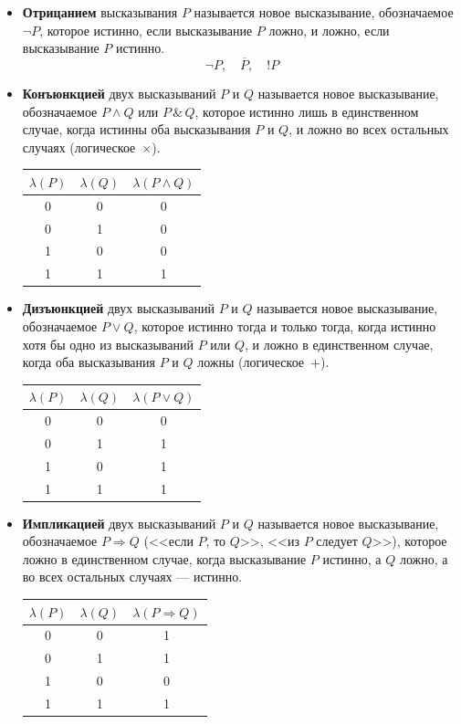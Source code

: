 \documentclass[a4paper, 12pt]{article}
\begin{document}
\begin{itemize}
  \item \textbf{Отрицанием} высказывания $P$ называется новое высказывание,
    обозначаемое $\neg P$, которое истинно, если высказывание $P$ ложно,
    и ложно, если высказывание $P$ истинно.
    \[ \boxed{\neg P,\quad \overline{P},\quad !P} \]

  \item \textbf{Конъюнкцией} двух высказываний $P$ и $Q$ называется новое
    высказывание, обозначаемое $P \wedge Q$ или $P \,\&\, Q$, которое истинно
    лишь в единственном случае, когда истинны оба высказывания $P$ и $Q$,
    и ложно во всех остальных случаях (логическое~$\times$).
    \begin{center}
    \begin{tabular}{c|c|c}
      $\lambda(P)$ & $\lambda(Q)$ & $\lambda(P \wedge Q)$ \\ \hline
      0 & 0 & 0 \\
      0 & 1 & 0 \\
      1 & 0 & 0 \\
      1 & 1 & 1 \\
    \end{tabular}
    \end{center}

  \item \textbf{Дизъюнкцией} двух высказываний $P$ и $Q$ называется новое
    высказывание, обозначаемое $P \vee Q$, которое истинно тогда и только
    тогда, когда истинно хотя бы одно из высказываний $P$ или $Q$, и ложно
    в единственном случае, когда оба высказывания $P$ и $Q$ ложны
    (логическое~$+$).
    \begin{center}
    \begin{tabular}{c|c|c}
      $\lambda(P)$ & $\lambda(Q)$ & $\lambda(P \vee Q)$ \\ \hline
      0 & 0 & 0 \\
      0 & 1 & 1 \\
      1 & 0 & 1 \\
      1 & 1 & 1 \\
    \end{tabular}
    \end{center}

  \item \textbf{Импликацией} двух высказываний $P$ и $Q$ называется новое
    высказывание, обозначаемое $P \Rightarrow Q$ (<<если $P$, то $Q$>>,
    <<из $P$ следует $Q$>>), которое ложно в единственном случае, когда
    высказывание $P$ истинно, а $Q$ ложно, а во всех остальных случаях ---
    истинно.
    \begin{center}
    \begin{tabular}{c|c|c}
      $\lambda(P)$ & $\lambda(Q)$ & $\lambda(P \Rightarrow Q)$ \\ \hline
      0 & 0 & 1 \\
      0 & 1 & 1 \\
      1 & 0 & 0 \\
      1 & 1 & 1 \\
    \end{tabular}
    \end{center}


\end{itemize}
\end{document}
